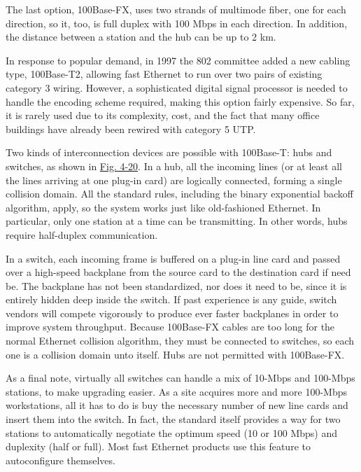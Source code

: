 \documentclass[b5paper,11pt]{memoir}
\begin{document}
The last option, {100Base-FX}, uses two strands of multimode fiber, one
for each direction, so it, too, is full duplex with 100 Mbps in each
direction. In addition, the distance between a station and the hub can
be up to 2 km.

In response to popular demand, in 1997 the 802 committee added a new
cabling type, 100Base-T2, allowing fast Ethernet to run over two pairs
of existing category 3 wiring. However, a sophisticated digital signal
processor is needed to handle the encoding scheme required, making this
option fairly expensive. So far, it is rarely used due to its
complexity, cost, and the fact that many office buildings have already
been rewired with category 5 UTP.

Two kinds of interconnection devices are possible with 100Base-T: hubs
and switches, as shown in
\protect\hyperlink{0130661023_ch04lev1sec3.htmlux5cux23ch04fig20}{Fig.
4-20}. In a hub, all the incoming lines (or at least all the lines
arriving at one plug-in card) are logically connected, forming a single
collision domain. All the standard rules, including the binary
exponential backoff algorithm, apply, so the system works just like
old-fashioned Ethernet. In particular, only one station at a time can be
transmitting. In other words, hubs require half-duplex communication.

In a switch, each incoming frame is buffered on a plug-in line card and
passed over a high-speed backplane from the source card to the
destination card if need be. The backplane has not been standardized,
nor does it need to be, since it is entirely hidden deep inside the
switch. If past experience is any guide, switch vendors will compete
vigorously to produce ever faster backplanes in order to improve system
throughput. Because 100Base-FX cables are too long for the normal
Ethernet collision algorithm, they must be connected to switches, so
each one is a collision domain unto itself. Hubs are not permitted with
100Base-FX.

As a final note, virtually all switches can handle a mix of 10-Mbps and
100-Mbps stations, to make upgrading easier. As a site acquires more and
more 100-Mbps workstations, all it has to do is buy the necessary number
of new line cards and insert them into the switch. In fact, the standard
itself provides a way for two stations to automatically negotiate the
optimum speed (10 or 100 Mbps) and duplexity (half or full). Most fast
Ethernet products use this feature to autoconfigure themselves.

\protect\hypertarget{0130661023_ch04lev1sec3.htmlux5cux23ch04lev2sec16}{}{}
\end{document}
